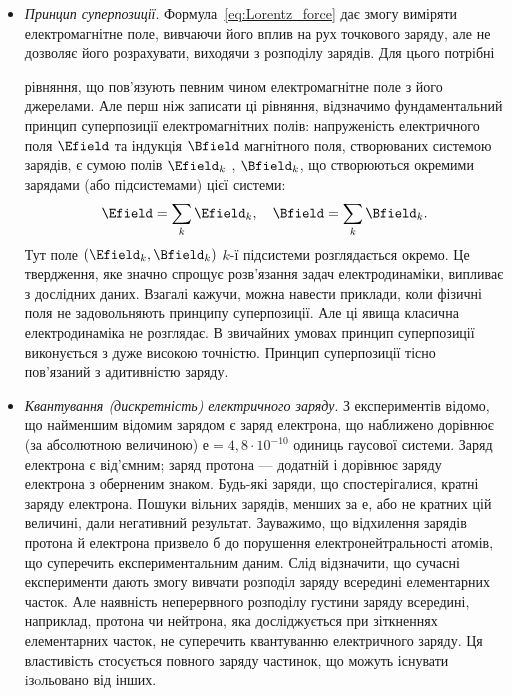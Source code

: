 \begin{itemize}

\item \textit{Принцип суперпозиції}. Формула~\eqref{eq:Lorentz_force} дає змогу виміряти
електромагнітне поле, вивчаючи його вплив на рух точкового заряду, але не
дозволяє його розрахувати, виходячи з розподілу зарядів. Для цього потрібні

рівняння, що пов’язують певним чином електромагнітне поле з його
джерелами. Але перш ніж записати ці рівняння, відзначимо фундаментальний
принцип суперпозиції електромагнітних полів: напруженість електричного
поля $\Efield$ та індукція $\Bfield$ магнітного поля, створюваних системою зарядів, є сумою
полів $\Efield_k$ , $\Bfield_k$, що створюються окремими зарядами (або підсистемами) цієї
системи:
\begin{equation}
    \Efield = \sum\limits_k \Efield_k, \quad \Bfield = \sum\limits_k \Bfield_k.
\end{equation}
 Тут поле $(\Efield_k, \Bfield_k)$ $k$-ї підсистеми розглядається окремо.
 Це твердження, яке значно спрощує розв’язання задач електродинаміки,
випливає з дослідних даних. Взагалі кажучи, можна навести приклади, коли
фізичні поля не задовольняють принципу суперпозиції. Але ці явища класична
електродинаміка не розглядає. В звичайних умовах принцип суперпозиції
виконується з дуже високою точністю. Принцип суперпозиції тісно пов’язаний
з адитивністю заряду.


\item \textit{Квантування (дискретність) електричного заряду}. З експериментів відомо, що найменшим відомим зарядом є заряд електрона, що наближено
дорівнює (за абсолютною величиною) $е=4,8\cdot10^{-10}$ одиниць
гаусової системи. Заряд електрона є від’ємним; заряд протона --- додатній і дорівнює заряду електрона з оберненим знаком. Будь-які заряди, що
спостерігалися, кратні заряду електрона. Пошуки вільних зарядів, менших за е, або не кратних цій величині, дали негативний результат. Зауважимо, що
відхилення зарядів протона й електрона призвело б до порушення електронейтральності атомів, що суперечить експериментальним даним. Слід відзначити, що
сучасні експерименти дають змогу вивчати розподіл заряду всередині елементарних часток. Але наявність неперервного розподілу густини заряду всередині,
наприклад, протона чи нейтрона, яка досліджується при зіткненнях елементарних часток, не суперечить квантуванню електричного заряду. Ця властивість
стосується повного заряду частинок, що можуть існувати iзoльовано від інших.



\end{itemize}
